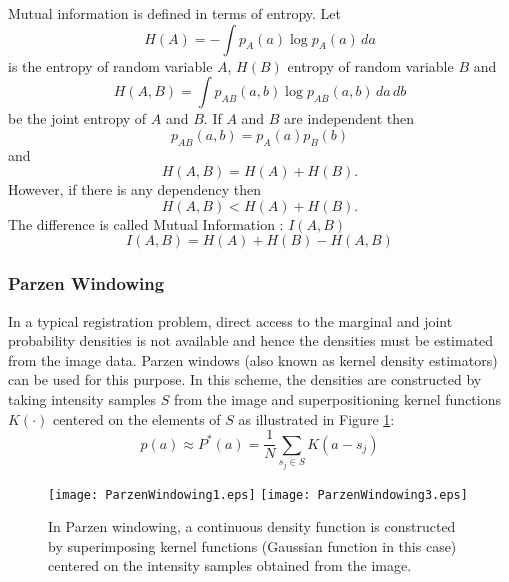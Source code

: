 Mutual information is defined in terms of entropy. Let
\begin{equation}
H(A) = - \int p_A(a) \log p_A(a)\, da
\end{equation}
is the entropy of random variable $A$, $H(B)$ entropy of 
random variable $B$ and 
\begin{equation}
H(A,B) = \int p_{AB}(a,b) \log p_{AB}(a,b)\,da\,db
\end{equation}
be the joint entropy of $A$ and $B$. If $A$ and $B$ are independent then
\begin{equation}
p_{AB}(a,b) = p_A(a) p_B(b)
\end{equation}
and
\begin{equation}
H(A,B) = H(A) + H(B).
\end{equation}
However, if there is any dependency then
\begin{equation}
H(A,B)<H(A)+H(B).
\end{equation}
The difference is called Mutual Information : \( I(A,B) \)
\begin{equation}
I(A,B)=H(A)+H(B)-H(A,B)
\end{equation}

\subsubsection{Parzen Windowing}
In a typical registration problem, direct access to the marginal 
and joint probability densities is not available and hence the
densities must be estimated from the image data. Parzen windows 
(also known as kernel density estimators) can be used for this purpose.
In this scheme, the densities are constructed by taking intensity 
samples $S$ from the image and superpositioning kernel functions 
$K(\cdot)$ centered on the elements of $S$ as illustrated in
Figure \ref{fig:ParzenWindowing}:
\begin{equation}
p(a) \approx P^{*}(a) = \frac{1}{N} \sum_{s_j \in S} K\left(a - s_j\right)
\end{equation}

\begin{figure}
\center
\texttt{[image: ParzenWindowing1.eps]}
\texttt{[image: ParzenWindowing3.eps]}
\caption{ In Parzen windowing, a continuous density function is constructed by
superimposing kernel functions (Gaussian function in this case) centered on
the intensity samples obtained from the image. }
\label{fig:ParzenWindowing}
\end{figure}

